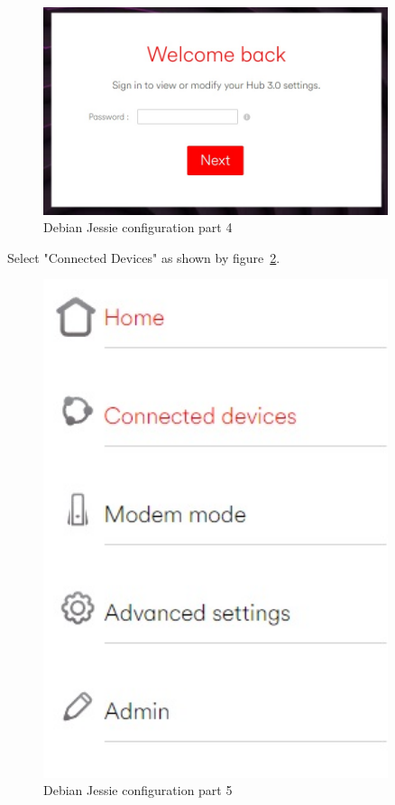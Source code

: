 \documentclass[12pt,]{article}
\begin{document}
\begin{figure}[H]
  	\begin{center}
    	\includegraphics[width=0.9\textwidth]{Ras_3}
  	\end{center}
  	\caption{Debian Jessie configuration part 4}
	\label{fig:21}
\end{figure}
Select "Connected Devices" as shown by figure~\ref{fig:22}.
\begin{figure}[H]
  	\begin{center}
    	\includegraphics[width=0.9\textwidth]{Ras_4}
  	\end{center}
  	\caption{Debian Jessie configuration part 5}
	\label{fig:22}
\end{figure}
\end{document}
